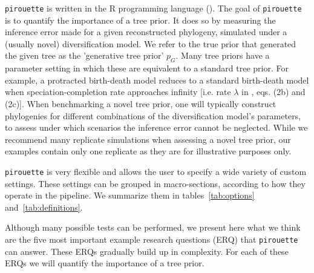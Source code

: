 \documentclass{article}
\begin{document}
\verb;pirouette; is written in the R programming language (\cite{R}).
The goal of \verb;pirouette; is to quantify the importance of a tree prior.
It does so by measuring the inference error made for a given reconstructed phylogeny, 
simulated under a (usually novel) diversification model.
We refer to the true prior that generated the given tree
as the 'generative tree prior' $\mathit{p_{G}}$.
Many tree priors have a parameter setting in which these are equivalent
to a standard tree prior. For example, a protracted birth-death model reduces to a standard birth-death model when speciation-completion rate approaches infinity [i.e. rate $\lambda$ in \cite{etienne2014estimating}, eqs. (2b) and (2c)].
When benchmarking a novel tree prior, 
one will typically construct phylogenies 
for different combinations of the diversification model's parameters, 
to assess under which scenarios the inference error cannot be neglected. 
While we recommend many replicate simulations when assessing a novel tree prior, our examples contain only one replicate as they are for illustrative purposes only.

\verb;pirouette; is very flexible and allows the user 
to specify a wide variety of custom settings. 
These settings can be grouped in macro-sections, 
according to how they operate in the pipeline. 
We summarize them in tables~\ref{tab:options} and~\ref{tab:definitions}.

Although many possible tests can be performed, 
we present here what we think are the five most important 
example research questions (ERQ) that \verb;pirouette; can answer. 
These ERQs gradually build up in complexity.
For each of these ERQs we will quantify the importance of a tree prior.
\end{document}
